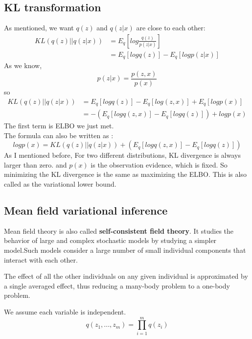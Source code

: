 \documentclass{article}
\begin{document}
\subsection{KL transformation}
As mentioned, we want $q(z)$ and $q(z|x)$ are close to each other:
\begin{align*}
KL(q(z)||q(z|x)) &= E_{q}\left[ log \frac{q(z)}{p(z|x)} \right] \\
&=E_{q}[logq(z)]-E_{q}[logp(z|x)]
\end{align*}
As we know,
$$p(z|x)=\frac{p(z,x)}{p(x)}$$
so 
\begin{align*}
KL(q(z)||q(z|x)) &= E_{q}[logq(z)]-E_{q}[log(z,x)]+E_{q}[logp(x)] \\
&= -(E_{q}[logq(z,x)]-E_{q}[logq(z)])+logp(x)
\end{align*}
The first term is ELBO we just met.\\
The formula can also be written as :
$$logp(x)=KL(q(z)||q(z|x))+(E_{q}[logq(z,x)]-E_{q}[logq(z)])$$
As I mentioned before, For two different distributions, KL divergence is always larger than zero. and $p(x)$ is the observation evidence, which is fixed. So minimizing the KL divergence is the same as maximizing the ELBO. This is also called as the variational lower bound.

\subsection{Mean field variational inference}
Mean field theory is also called \textbf{self-consistent field theory}. It studies the behavior of large and complex stochastic models by studying a simpler model.Such models consider a large number of small individual components that interact with each other.

The effect of all the other individuals on any given individual is approximated by a single averaged effect, thus reducing a many-body problem to a one-body problem.

We assume each variable is independent.
$$q(z_{1},...,z_{m})= \prod _{i=1}^{m}q(z_{i})$$
\end{document}
